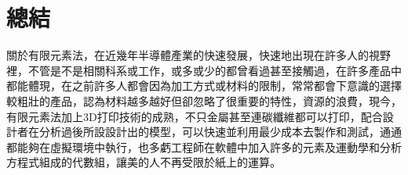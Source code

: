 \section{總結}
關於有限元素法，在近幾年半導體產業的快速發展，快速地出現在許多人的視野裡，不管是不是相關科系或工作，或多或少的都曾看過甚至接觸過，在許多產品中都能體現，在之前許多人都會因為加工方式或材料的限制，常常都會下意識的選擇較粗壯的產品，認為材料越多越好但卻忽略了很重要的特性，資源的浪費，現今，有限元素法加上3D打印技術的成熟，不只金屬甚至連碳纖維都可以打印，配合設計者在分析過後所設設計出的模型，可以快速並利用最少成本去製作和測試，通通都能夠在虛擬環境中執行，也多虧工程師在軟體中加入許多的元素及運動學和分析方程式組成的代數組，讓美的人不再受限於紙上的運算。\\
\newpage

